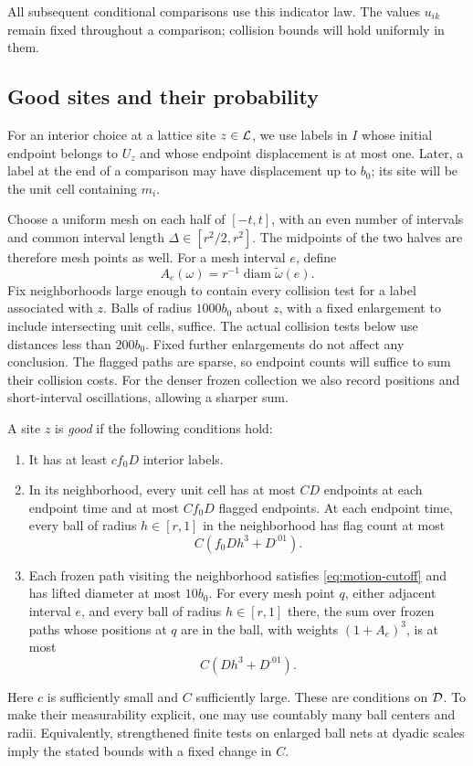 All subsequent conditional comparisons use this indicator law.  The
values $u_{ik}$ remain fixed throughout a comparison; collision bounds
will hold uniformly in them.

\subsection{Good sites and their probability}

For an interior choice at a lattice site $z\in\mathcal L$, we use labels in $I$
whose initial endpoint belongs to $U_z$ and whose endpoint displacement
is at most one.  Later, a label at the end of a comparison may have
displacement up to $b_0$; its site will be the unit cell containing $m_i$.

Choose a uniform mesh on each half of $[-t,t]$, with an even number of
intervals and common interval length $\Delta\in[r^2/2,r^2]$.  The
midpoints of the two halves are therefore mesh points as well.  For a
mesh interval $e$, define
\[
                   A_e(\omega)=r^{-1}\operatorname{diam}
                                             \widetilde\omega(e).
\]
Fix neighborhoods large enough to contain every collision test for a
label associated with $z$.  Balls of radius $1000b_0$ about $z$, with a
fixed enlargement to include intersecting unit cells, suffice.  The
actual collision tests below use distances less than $200b_0$.
Fixed further enlargements do not affect any conclusion.
The flagged paths are sparse, so endpoint counts will suffice to sum
their collision costs.  For the denser frozen collection we also record
positions and short-interval oscillations, allowing a sharper sum.

A site $z$ is \emph{good} if the following conditions hold:
\begin{enumerate}
\item It has at least $cf_0D$ interior labels.
\item In its neighborhood, every unit cell has at most $CD$ endpoints
at each endpoint time and at most $Cf_0D$ flagged endpoints.  At each
endpoint time, every ball of radius $h\in[r,1]$ in the neighborhood has
flag count at most
\begin{equation}\label{eq:flag-count}
                         C(f_0Dh^3+D^{.01}).
\end{equation}
\item Each frozen path visiting the neighborhood satisfies
\eqref{eq:motion-cutoff} and has lifted diameter at most $10b_0$.
For every mesh point $q$, either adjacent interval $e$, and every ball
of radius $h\in[r,1]$ there, the sum over frozen paths whose positions at
$q$ are in the ball, with weights $(1+A_e)^3$, is at most
\begin{equation}\label{eq:weighted-count}
                            C(Dh^3+D^{.01}).
\end{equation}
\end{enumerate}
Here $c$ is sufficiently small and $C$ sufficiently large.  These are
conditions on $\mathcal D$.  To make their measurability explicit, one may use
countably many ball centers and radii.  Equivalently, strengthened
finite tests on enlarged ball nets at dyadic scales imply the stated
bounds with a fixed change in $C$.


